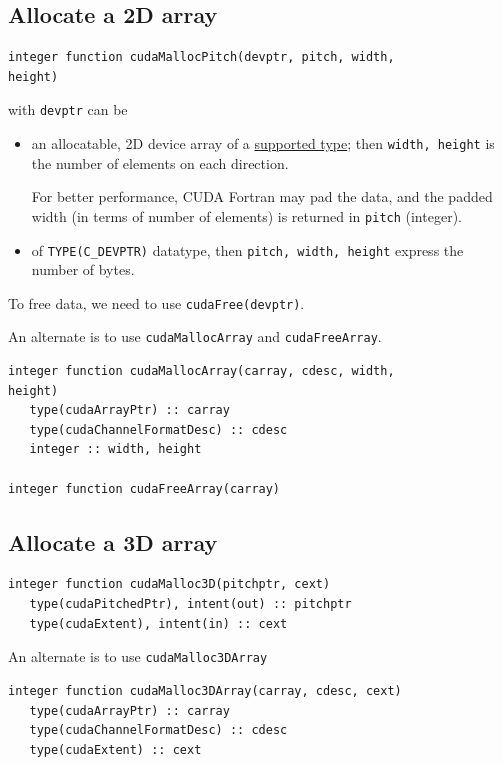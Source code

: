 \subsection{Allocate a 2D array}
\label{sec:allocate-2d-array}

\begin{lstlisting}
integer function cudaMallocPitch(devptr, pitch, width,
height)
\end{lstlisting}
with \verb!devptr! can be
\begin{itemize}
\item an allocatable, 2D device array of a
  \hyperref[sec:datatype-data-device]{supported type}; then
  \verb!width, height!  is the number of elements on each direction.

  For better performance, CUDA Fortran may pad the data, and the
  padded width (in terms of number of elements) is returned in
  \verb!pitch!  (integer).
\item of \verb!TYPE(C_DEVPTR)! datatype, then
  \verb!pitch, width, height! express the number of bytes.
\end{itemize}

To free data, we need to use \verb!cudaFree(devptr)!. 

An alternate is to use \verb!cudaMallocArray! and
\verb!cudaFreeArray!.
\begin{lstlisting}
integer function cudaMallocArray(carray, cdesc, width,
height)
   type(cudaArrayPtr) :: carray
   type(cudaChannelFormatDesc) :: cdesc
   integer :: width, height

integer function cudaFreeArray(carray)
\end{lstlisting}


\subsection{Allocate a 3D array}
\label{sec:allocate-3d-array}

\begin{lstlisting}
integer function cudaMalloc3D(pitchptr, cext)
   type(cudaPitchedPtr), intent(out) :: pitchptr
   type(cudaExtent), intent(in) :: cext
\end{lstlisting}


An alternate is to use \verb!cudaMalloc3DArray!
\begin{lstlisting}
integer function cudaMalloc3DArray(carray, cdesc, cext)
   type(cudaArrayPtr) :: carray
   type(cudaChannelFormatDesc) :: cdesc
   type(cudaExtent) :: cext
\end{lstlisting}


